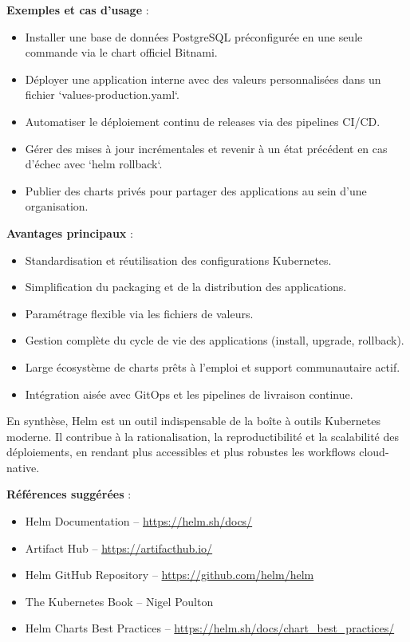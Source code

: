 \textbf{Exemples et cas d’usage} :
\begin{itemize}
	\item Installer une base de données PostgreSQL préconfigurée en une seule commande via le chart officiel Bitnami.
	\item Déployer une application interne avec des valeurs personnalisées dans un fichier `values-production.yaml`.
	\item Automatiser le déploiement continu de releases via des pipelines CI/CD.
	\item Gérer des mises à jour incrémentales et revenir à un état précédent en cas d’échec avec `helm rollback`.
	\item Publier des charts privés pour partager des applications au sein d’une organisation.
\end{itemize}

\textbf{Avantages principaux} :
\begin{itemize}
	\item Standardisation et réutilisation des configurations Kubernetes.
	\item Simplification du packaging et de la distribution des applications.
	\item Paramétrage flexible via les fichiers de valeurs.
	\item Gestion complète du cycle de vie des applications (install, upgrade, rollback).
	\item Large écosystème de charts prêts à l’emploi et support communautaire actif.
	\item Intégration aisée avec GitOps et les pipelines de livraison continue.
\end{itemize}

En synthèse, Helm est un outil indispensable de la boîte à outils Kubernetes moderne. Il contribue à la rationalisation, la reproductibilité et la scalabilité des déploiements, en rendant plus accessibles et plus robustes les workflows cloud-native.

\textbf{Références suggérées} :
\begin{itemize}
	\item Helm Documentation – \url{https://helm.sh/docs/}
	\item Artifact Hub – \url{https://artifacthub.io/}
	\item Helm GitHub Repository – \url{https://github.com/helm/helm}
	\item The Kubernetes Book – Nigel Poulton
	\item Helm Charts Best Practices – \url{https://helm.sh/docs/chart_best_practices/}
\end{itemize}

